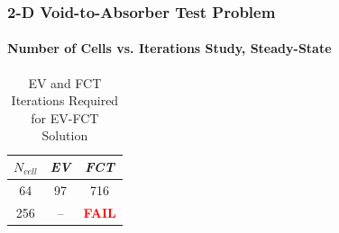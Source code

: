 %
%
%
%
\begin{frame}
\frametitle{2-D Void-to-Absorber Test Problem}
\framesubtitle{Number of Cells vs. Iterations Study, Steady-State}

\begin{center}
\begin{table}[h]
\caption{EV and FCT Iterations Required for EV-FCT Solution}
\begin{tabular}{c c c}\toprule
$N_{cell}$ & \emph{EV} & \emph{FCT}\\\midrule
 64 & 97 & 716\\
256 & -- & \textcolor{red}{\textbf{FAIL}}\\
\bottomrule\end{tabular}
\end{table}
\end{center}

\end{frame}
